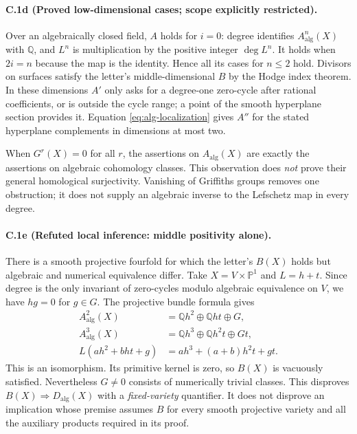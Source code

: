 \paragraph{C.1d (Proved low-dimensional cases; scope explicitly restricted).}
Over an algebraically closed field, $A$ holds for $i=0$: degree identifies
$A^n_{\mathrm{alg}}(X)$ with $\mathbb Q$, and $L^n$ is multiplication by
the positive integer $\deg L^n$. It holds when $2i=n$ because the map is
the identity. Hence all its cases for $n\le2$ hold. Divisors on surfaces
satisfy the letter's middle-dimensional $B$ by the Hodge index theorem.
In these dimensions $A'$ only asks for a degree-one zero-cycle after
rational coefficients, or is outside the cycle range; a point of the
smooth hyperplane section provides it. Equation
\eqref{eq:alg-localization} gives $A''$ for the stated hyperplane
complements in dimensions at most two.

When $G^r(X)=0$ for all $r$, the assertions on $A_{\mathrm{alg}}(X)$ are
exactly the assertions on algebraic cohomology classes. This observation
does \emph{not} prove their general homological surjectivity. Vanishing
of Griffiths groups removes one obstruction; it does not supply an
algebraic inverse to the Lefschetz map in every degree.

\paragraph{C.1e (Refuted local inference: middle positivity alone).}
There is a smooth projective fourfold for which the letter's $B(X)$
holds but algebraic and numerical equivalence differ. Take
$X=V\times\mathbb P^1$ and $L=h+t$. Since degree is the only invariant
of zero-cycles modulo algebraic equivalence on $V$, we have $hg=0$ for
$g\in G$. The projective bundle formula gives
\[
\begin{split}
A^2_{\mathrm{alg}}(X)&=\mathbb Qh^2\oplus\mathbb Qht\oplus G,\\
A^3_{\mathrm{alg}}(X)&=\mathbb Qh^3\oplus\mathbb Qh^2t\oplus Gt,\\
L(ah^2+bht+g)&=ah^3+(a+b)h^2t+gt.
\end{split}
\]
This is an isomorphism. Its primitive kernel is zero, so $B(X)$ is
vacuously satisfied. Nevertheless $G\ne0$ consists of numerically trivial
classes. This disproves $B(X)\Rightarrow D_{\mathrm{alg}}(X)$ with a
\emph{fixed-variety} quantifier. It does not disprove an implication
whose premise assumes $B$ for every smooth projective variety and all
the auxiliary products required in its proof.

